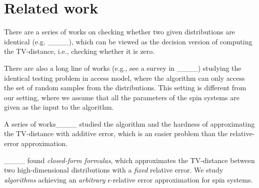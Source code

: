 \section{Related work}
There are a series of works on checking whether two given distributions are identical (e.g. ____), which can be viewed as the decision version of computing the TV-distance, i.e., checking whether it is zero. 



There are also a long line of works (e.g., see a survey in ____) studying the identical testing problem in access model, where the algorithm can only access the set of random samples from the distributions.
This setting is different from our setting, where we assume that all the parameters of the spin systems are given as the input to the algorithm.


A series of works____ studied the algorithm and the hardness of approximating the TV-distance with additive error, which is an easier problem than the relative-error approximation.


____ found \emph{closed-form formulas}, which approximates the TV-distance between two high-dimensional distributions with a \emph{fixed} relative error.
We study \emph{algorithms} achieving an \emph{arbitrary} $\epsilon$-relative error approximation for spin systems.


%